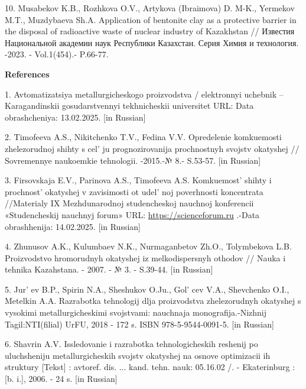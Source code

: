 \begin{references}
10. Musabekov K.B., Rozhkova O.V., Artykova (Ibraimova) D. M-K., Yermekov
M.T., Muzdybaeva Sh.A. Application of bentonite clay as a protective
barrier in the disposal of radioactive waste of nuclear industry of
Kazakhstan // Известия Национальной академии наук Республики Казахстан.
Серия Химия и технология. -2023. - Vol.1(454).- P.66-77.
\href{https://doi.org/10.32014/2023.2518-1491.148}{}
\end{references}

\begin{center}
{\bfseries References}
\end{center}

\begin{references}
1. Avtomatizatsiya metallurgicheskogo proizvodstva / elektronnyi uchebnik
-- Karagandinskii gosudarstv\-ennyi tekhnicheskii universitet URL:
\href{https://www.kstu.kz/wp-content/uploads/2018/05/tsifrovaya-mitallurgiya/el-uch-po-ampr/index.htm-}{}
Data obrashcheniya: 13.02.2025. {[}in Russian{]}

2. Timofeeva A.S., Nikitchenko T.V., Fedina V.V. Opredelenie komkuemosti
zhelezorudnoj shihty s cel' ju prognozirovanija
prochnostnyh svojstv okatyshej // Sovremennye naukoemkie tehnologii.
-2015.-№ 8.- S.53-57. {[}in Russian{]}

3. Firsovskaja E.V., Parinova A.S., Timofeeva A.S.
Komkuemost'{} shihty i prochnost'{}
okatyshej v zavis\-imosti ot udel' noj poverhnosti
koncentrata //Materialy IX Mezhdunarodnoj studencheskoj nauchnoj
konf\-erencii «Studencheskij nauchnyj forum» URL:
\href{https://scienceforum.ru/2017/article/2017038139}{https://scienceforum.ru} .-Data obrashhenija:
14.02.2025. {[}in Russian{]}

4. Zhunusov A.K., Kulumbaev N.K., Nurmaganbetov Zh.O., Tolymbekova L.B.
Proizvodstvo hromorudnyh okatyshej iz melkodispersnyh othodov // Nauka i
tehnika Kazahstana. - 2007. - № 3. - S.39-44. {[}in Russian{]}

5. Jur' ev B.P., Spirin N.A., Sheshukov O.Ju.,
Gol' cev V.A., Shevchenko O.I., Metelkin A.A. Razrabotka
tehnologij dlja proizvodstva zhelezorudnyh okatyshej s vysokimi
metallurgicheskimi svojstvami: nauchnaja monografija.-Nizhnij
Tagil:NTI(filial) UrFU, 2018 - 172 s. ISBN 978-5-9544-0091-5. {[}in
Russian{]}

6. Shavrin A.V. Issledovanie i razrabotka tehnologicheskih reshenij po
uluchsheniju metallurgicheskih svojstv okatyshej na osnove optimizacii
ih struktury {[}Tekst{]} : avtoref. dis. ... kand. tehn. nauk: 05.16.02
/. - Ekaterinburg : {[}b. i.{]}, 2006. - 24 s. {[}in Russian{]}


\end{references}
